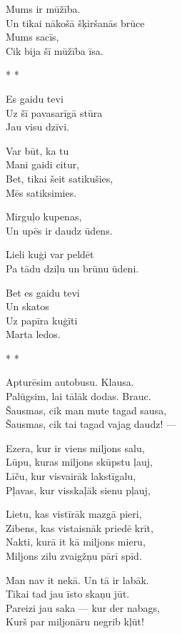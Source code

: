 \documentclass[14pt]{extarticle}
\begin{document}
Mums ir mūžība.\\
 
Un tikai nākošā šķiršanās brūce\\
Mums sacīs,\\
Cik bija šī mūžība īsa.


\newpage

{\large \sc * * *}

Es gaidu tevi\\
Uz šī pavasarīgā stūra\\
Jau visu dzīvi.

Var būt, ka tu\\
Mani gaidi citur,\\
Bet, tikai šeit satikušies,\\
Mēs satiksimies.

Mirguļo kupenas,\\
Un upēs ir daudz ūdens.

Lieli kuģi var peldēt\\
Pa tādu dziļu un brūnu ūdeni.

Bet es gaidu tevi\\
Un skatos\\
Uz papīra kuģīti\\
Marta ledos.



\newpage

{\large \sc * * *}

Apturēsim autobusu. Klausa.\\
Palūgsim, lai tālāk dodas. Brauc.\\
Šausmas, cik man mute tagad sausa,\\
Šausmas, cik tai tagad vajag daudz! ---

Ezera, kur ir viens miljons salu,\\
Lūpu, kuras miljons skūpstu ļauj,\\
Līču, kur visvairāk lakstīgalu,\\
Pļavas, kur visskaļāk sienu pļauj,

Lietu, kas vistīrāk mazgā pieri,\\
Zibens, kas vistaisnāk priedē krīt,\\
Nakti, kurā it kā miljons mieru,\\
Miljons zilu zvaigžņu pārī spīd.

Man nav it nekā. Un tā ir labāk.\\
Tikai tad jau īsto skaņu jūt.\\
Pareizi jau saka --- kur der nabags,\\
Kurš par miljonāru negrib kļūt!
\end{document}

